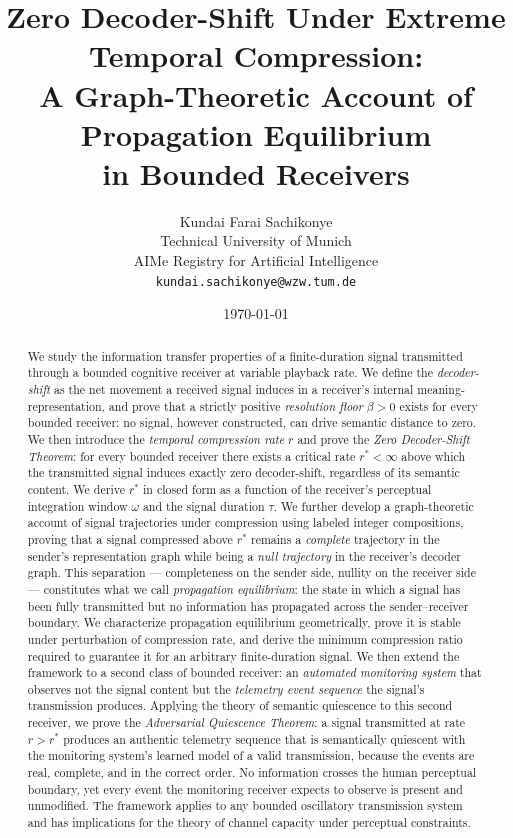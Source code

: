 \documentclass[twocolumn,11pt,a4paper]{article}
\title{\bfseries Zero Decoder-Shift Under Extreme Temporal Compression:\\
A Graph-Theoretic Account of Propagation Equilibrium\\
in Bounded Receivers}
\author{
Kundai Farai Sachikonye\\
Technical University of Munich\\
AIMe Registry for Artificial Intelligence\\
\texttt{kundai.sachikonye@wzw.tum.de}
}
\date{\today}
\theoremstyle{main}
\theoremstyle{definition}
\theoremstyle{remark}
\newcommand{\floor}{\beta}
\newcommand{\rate}{r}
\newcommand{\window}{\omega}
\begin{document}
\maketitle

\begin{abstract}
\noindent
We study the information transfer properties of a finite-duration signal
transmitted through a bounded cognitive receiver at variable playback
rate. We define the \emph{decoder-shift} as the net movement a received
signal induces in a receiver's internal meaning-representation, and prove
that a strictly positive \emph{resolution floor} $\floor > 0$ exists for
every bounded receiver: no signal, however constructed, can drive
semantic distance to zero. We then introduce the \emph{temporal
compression rate} $\rate$ and prove the \emph{Zero Decoder-Shift
Theorem}: for every bounded receiver there exists a critical rate
$\rate^* < \infty$ above which the transmitted signal induces exactly
zero decoder-shift, regardless of its semantic content. We derive
$\rate^*$ in closed form as a function of the receiver's perceptual
integration window $\window$ and the signal duration $\tau$. We further
develop a graph-theoretic account of signal trajectories under
compression using labeled integer compositions, proving that a signal
compressed above $\rate^*$ remains a \emph{complete} trajectory in the
sender's representation graph while being a \emph{null trajectory} in
the receiver's decoder graph. This separation --- completeness on the
sender side, nullity on the receiver side --- constitutes what we call
\emph{propagation equilibrium}: the state in which a signal has been
fully transmitted but no information has propagated across the
sender--receiver boundary. We characterize propagation equilibrium
geometrically, prove it is stable under perturbation of compression
rate, and derive the minimum compression ratio required to guarantee it
for an arbitrary finite-duration signal. We then extend the framework
to a second class of bounded receiver: an \emph{automated monitoring
system} that observes not the signal content but the \emph{telemetry
event sequence} the signal's transmission produces. Applying the theory
of semantic quiescence to this second receiver, we prove the
\emph{Adversarial Quiescence Theorem}: a signal transmitted at rate
$\rate > \rate^*$ produces an authentic telemetry sequence that is
semantically quiescent with the monitoring system's learned model of a
valid transmission, because the events are real, complete, and in the
correct order. No information crosses the human perceptual boundary, yet
every event the monitoring receiver expects to observe is present and
unmodified. The framework applies to any bounded oscillatory transmission
system and has implications for the theory of channel capacity under
perceptual constraints.
\end{abstract}
\end{document}
